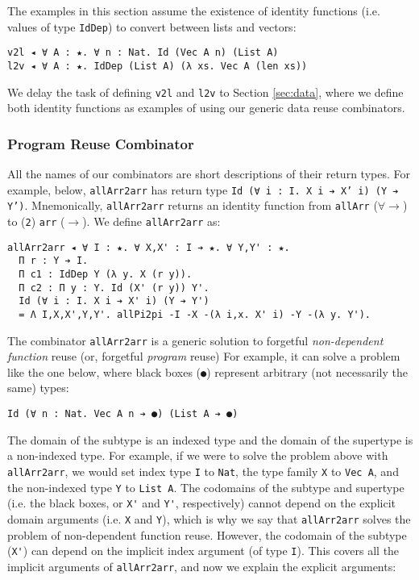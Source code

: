 \documentclass[acmsmall,screen]{acmart}
\newcommand{\refsec}[1]{Section \ref{sec:#1}}
\begin{document}
The examples in this section assume the existence of
identity functions (i.e. values of type \verb;IdDep;)
to convert between lists and vectors:
\begin{verbatim}
v2l ◂ ∀ A : ★. ∀ n : Nat. Id (Vec A n) (List A)
l2v ◂ ∀ A : ★. IdDep (List A) (λ xs. Vec A (len xs))
\end{verbatim}
We delay the task of defining \verb;v2l; and \verb;l2v; to
\refsec{data}, where we define both identity functions as examples
of using our generic data reuse combinators.

\subsubsection{Program Reuse Combinator}

All the names of our combinators are short descriptions of their
return types. For example, below, \verb;allArr2arr; has return type
\texttt{Id (∀ i : I. X i ➔ X' i) (Y ➔ Y')}. Mnemonically,
\verb;allArr2arr; returns an identity function from \verb;allArr;
($\forall\rightarrow$) to (\verb;2;) \verb;arr; ($\rightarrow$).
We define \verb;allArr2arr; as:
\begin{verbatim}
allArr2arr ◂ ∀ I : ★. ∀ X,X' : I ➔ ★. ∀ Y,Y' : ★.
  Π r : Y ➔ I.
  Π c1 : IdDep Y (λ y. X (r y)).
  Π c2 : Π y : Y. Id (X' (r y)) Y'.
  Id (∀ i : I. X i ➔ X' i) (Y ➔ Y')
  = Λ I,X,X',Y,Y'. allPi2pi -I -X -(λ i,x. X' i) -Y -(λ y. Y').
\end{verbatim}
The combinator \verb;allArr2arr; is a generic solution to forgetful
\textit{non-dependent function} reuse (or, forgetful \textit{program}
reuse) For example, it can solve a problem like the one below, where black boxes
(\verb;●;) represent arbitrary (not necessarily the same) types:
\begin{verbatim}
Id (∀ n : Nat. Vec A n ➔ ●) (List A ➔ ●)
\end{verbatim}
The domain of the subtype is an indexed type
and the domain of the supertype is a non-indexed type.
For example, if
we were to solve the problem above with \verb;allArr2arr;, we would set
index type \verb;I; to \verb;Nat;, the type family \verb;X; to
\verb;Vec A;, and the non-indexed type \verb;Y; to \verb;List A;.
The codomains of the subtype and supertype
(i.e. the black boxes, or \verb;X'; and \verb;Y';, respectively)
cannot depend on the
explicit domain arguments (i.e. \verb;X; and \verb;Y;),
which is why we say that \verb;allArr2arr; solves the problem of
non-dependent function reuse.
However, the codomain of the subtype (\verb;X';)
can depend on the implicit index argument (of type \verb;I;).
This covers all the implicit arguments of \verb;allArr2arr;,
and now we explain the explicit arguments:
\end{document}
